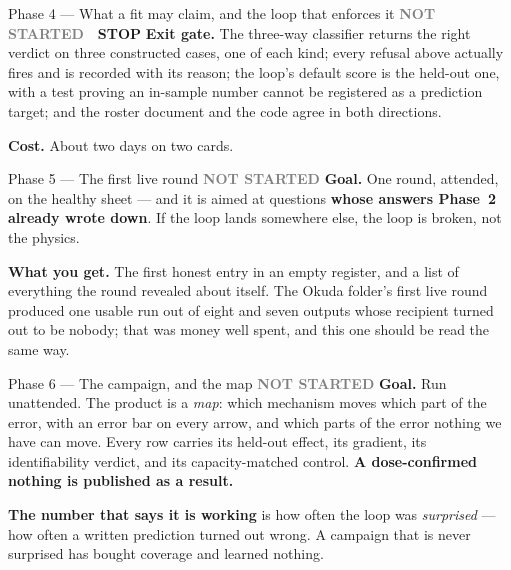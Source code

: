 \documentclass[11pt,a4paper]{article}
\newcommand{\todo}{\textcolor{grey}{\textbf{NOT STARTED}}}
\newcommand{\stopp}{\textcolor{bad!30!white}{\textbf{STOP}}}
\begin{document}
\begin{phasebox}{Phase 4 --- What a fit may claim, and the loop that enforces it \hfill \todo\ \ \stopp}
\textbf{Exit gate.} The three-way classifier returns the right verdict on three constructed cases,
one of each kind; every refusal above actually fires and is recorded with its reason; the loop's
default score is the held-out one, with a test proving an in-sample number cannot be registered as a
prediction target; and the roster document and the code agree in both directions.

\textbf{Cost.} About two days on two cards.
\end{phasebox}

\begin{phasebox}{Phase 5 --- The first live round \hfill \todo}
\textbf{Goal.} One round, attended, on the healthy sheet --- and it is aimed at questions
\textbf{whose answers Phase~2 already wrote down}. If the loop lands somewhere else, the loop is
broken, not the physics.

\textbf{What you get.} The first honest entry in an empty register, and a list of everything the
round revealed about itself. The Okuda folder's first live round produced one usable run out of
eight and seven outputs whose recipient turned out to be nobody; that was money well spent, and this
one should be read the same way.
\end{phasebox}

\begin{phasebox}{Phase 6 --- The campaign, and the map \hfill \todo}
\textbf{Goal.} Run unattended. The product is a \emph{map}: which mechanism moves which part of the
error, with an error bar on every arrow, and which parts of the error nothing we have can move.
Every row carries its held-out effect, its gradient, its identifiability verdict, and its
capacity-matched control. \textbf{A dose-confirmed nothing is published as a result.}

\textbf{The number that says it is working} is how often the loop was \emph{surprised} --- how often
a written prediction turned out wrong. A campaign that is never surprised has bought coverage and
learned nothing.
\end{phasebox}
\end{document}
